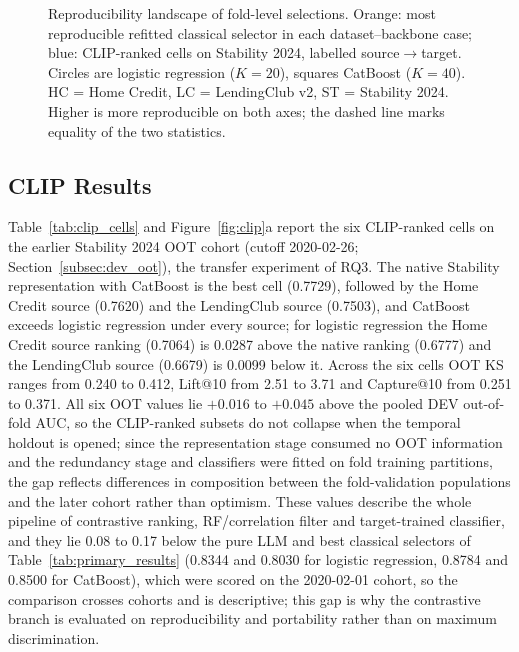 \documentclass[final,5p,twocolumn]{elsarticle}
\newcommand{\Kfeat}{K}
\begin{document}
\begin{figure}[htbp]
\caption{Reproducibility landscape of fold-level selections. Orange: most reproducible refitted classical selector in each dataset--backbone case; blue: CLIP-ranked cells on Stability 2024, labelled source$\rightarrow$target. Circles are logistic regression ($\Kfeat=20$), squares CatBoost ($\Kfeat=40$). HC = Home Credit, LC = LendingClub v2, ST = Stability 2024. Higher is more reproducible on both axes; the dashed line marks equality of the two statistics.}
\label{fig:stability}
\end{figure}

\subsection{CLIP Results}
\label{subsec:clip_results}

Table~\ref{tab:clip_cells} and Figure~\ref{fig:clip}a report the six CLIP-ranked cells on the earlier Stability 2024 OOT cohort (cutoff 2020-02-26; Section~\ref{subsec:dev_oot}), the transfer experiment of RQ3. The native Stability representation with CatBoost is the best cell (0.7729), followed by the Home Credit source (0.7620) and the LendingClub source (0.7503), and CatBoost exceeds logistic regression under every source; for logistic regression the Home Credit source ranking (0.7064) is 0.0287 above the native ranking (0.6777) and the LendingClub source (0.6679) is 0.0099 below it. Across the six cells OOT KS ranges from 0.240 to 0.412, Lift@10 from 2.51 to 3.71 and Capture@10 from 0.251 to 0.371. All six OOT values lie $+0.016$ to $+0.045$ above the pooled DEV out-of-fold AUC, so the CLIP-ranked subsets do not collapse when the temporal holdout is opened; since the representation stage consumed no OOT information and the redundancy stage and classifiers were fitted on fold training partitions, the gap reflects differences in composition between the fold-validation populations and the later cohort rather than optimism. These values describe the whole pipeline of contrastive ranking, RF/correlation filter and target-trained classifier, and they lie 0.08 to 0.17 below the pure LLM and best classical selectors of Table~\ref{tab:primary_results} (0.8344 and 0.8030 for logistic regression, 0.8784 and 0.8500 for CatBoost), which were scored on the 2020-02-01 cohort, so the comparison crosses cohorts and is descriptive; this gap is why the contrastive branch is evaluated on reproducibility and portability rather than on maximum discrimination.
\end{document}
